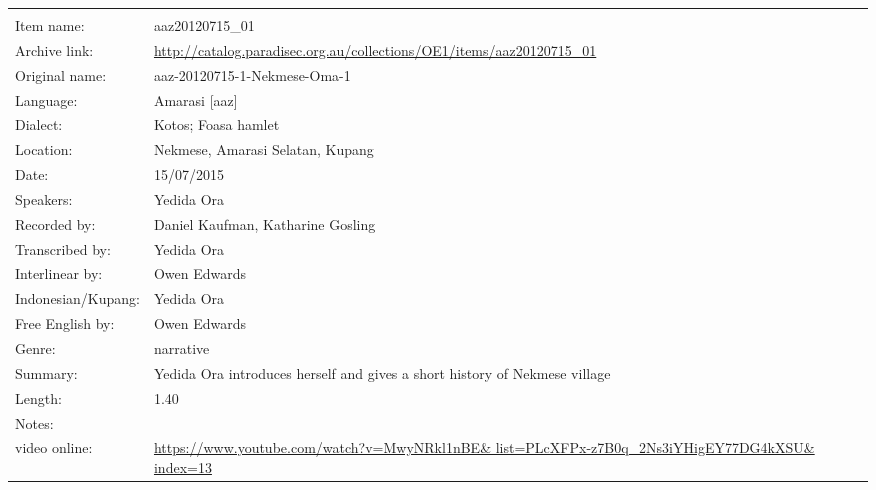 \newpage
\noindent
\wg\begin{tabular}{lL{.67\textwidth}}
			& \\
Item name:			& aaz20120715{\_}01\\
Archive link:			& \url{http://catalog.paradisec.org.au/collections/OE1/items/aaz20120715_01}\\
Original name:			& aaz-20120715-1-Nekmese-Oma-1 \\
Language:				& Amarasi [aaz] \\
Dialect:				& Kotos; Fo{\Q}asa{\Q} hamlet \\
Location:				& Nekmese{\Q}, Amarasi Selatan, Kupang \\
Date:				& 15/07/2015 \\
Speakers:				& Yedida Ora \\
Recorded by:			& Daniel Kaufman, Katharine Gosling \\
Transcribed by:		& Yedida Ora \\
Interlinear by:		& Owen Edwards \\
Indonesian/Kupang:		& Yedida Ora \\
Free English by:		& Owen Edwards \\
Genre:				& narrative \\
Summary:				& Yedida Ora introduces herself and gives a short history of Nekmese{\Q} village \\
Length:				& 1.40 \\
Notes:				& \\
video online: & \url{https://www.youtube.com/watch?v=MwyNRkl1nBE& list=PLcXFPx-z7B0q_2Ns3iYHigEY77DG4kXSU& index=13} \\
\end{tabular}

